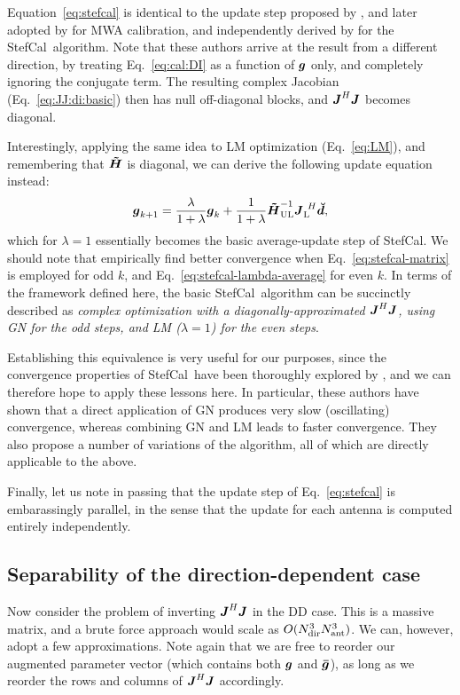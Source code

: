\documentclass[useAMS,usenatbib]{mn2e}
\newcommand{\mat}[1]{{\bmath{#1}}}
\newcommand{\JJ}{\mat{J}} %
\newcommand{\HHa}{\mat{\tilde{H}}} %
\newcommand{\JHJ}{\JJ^H\JJ} %
\newcommand{\AUG}[1]{\bmath{\breve{#1}}}
\newcommand{\Dd}{\AUG{d}}
\newcommand{\LEFT}{\mathrm{L}}
\newcommand{\UL}{\mathrm{UL}}%
\newcommand{\StefCal}{{\sc StefCal}}
\numberwithin{equation}{section}
\begin{document}
Equation~\ref{eq:stefcal} is identical to the update step proposed by \citet{ME4}, and later adopted by 
\citet{Mitchell-RTS} for MWA calibration, and independently derived by \citet{Stefcal} for the \StefCal\ algorithm. 
Note that these authors arrive at the result from a different 
direction, by treating Eq.~\ref{eq:cal:DI} as a function of $\bmath{g}$ only, and completely ignoring 
the conjugate term. 
The resulting complex Jacobian (Eq.~\ref{eq:JJ:di:basic}) then has null off-diagonal blocks, and $\JJ^H\JJ$ becomes 
diagonal.

Interestingly, applying the same idea to LM optimization (Eq.~\ref{eq:LM}), and remembering that $\HHa$ is 
diagonal, we can derive the following update equation instead:
\begin{equation}
\bmath{g}_{k+1} = \frac{\lambda}{1+\lambda}\bmath{g}_k + \frac{1}{1+\lambda} \HHa_{\UL}^{-1} \JJ_\LEFT^{~H} \Dd,
\label{eq:stefcal-lambda-average}
\end{equation}
which for $\lambda=1$ essentially becomes the basic average-update step of \StefCal. We should note that \citet{Stefcal}
empirically find better convergence when Eq.~\ref{eq:stefcal-matrix} is employed for odd $k$, and 
Eq.~\ref{eq:stefcal-lambda-average} for even $k$. In terms of the framework defined here, the basic \StefCal\ algorithm 
can be succinctly described as {\em complex optimization with a 
diagonally-approximated $\JHJ$, using GN for the odd steps, and LM ($\lambda=1$) for the even steps}.

Establishing this equivalence is 
very useful for our purposes, since the convergence properties of \StefCal\ have been thoroughly explored 
by \citet{Stefcal}, and we can therefore hope to apply these lessons here. In particular, these authors have shown 
that a direct application of GN produces very slow (oscillating) convergence, whereas combining GN and LM leads to faster convergence. They also propose a number of variations of the algorithm, all of which are 
directly applicable to the above.

Finally, let us note in passing that the update step of Eq.~\ref{eq:stefcal} is embarassingly parallel, in the sense 
that the update for each antenna is computed entirely independently.

\subsection{Separability of the direction-dependent case}

Now consider the problem of inverting $\JHJ$ in the DD case. This is a massive matrix, and a brute force 
approach would scale as $O(N_\mathrm{dir}^3N_\mathrm{ant}^3)$. We can, however, adopt a few approximations. Note again that we are 
free to reorder our augmented parameter vector (which contains both $\bmath{g}$ and $\bmath{\bar g}$), 
as long as we reorder the rows and columns of $\JHJ$ accordingly.
\end{document}
